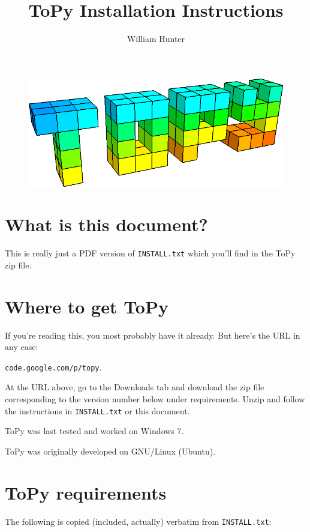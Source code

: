 \documentclass[10pt, a4paper]{article}
\author{William Hunter}
\title{ToPy Installation Instructions}
\begin{document}
\begin{figure}[!ht]
\centering
\includegraphics[scale=0.25]{topy_logo3d.png}
\end{figure}

\tableofcontents

\section{What is this document?}
This is really just a PDF version of \texttt{INSTALL.txt} which you'll find in the ToPy zip file.

\section{Where to get ToPy}
If you're reading this, you most probably have it already. But here's the URL in any case:

\texttt{code.google.com/p/topy}.

At the URL above, go to the \textsf{Downloads} tab and download the zip file corresponding to the version
number below under requirements. Unzip and follow the instructions in \texttt{INSTALL.txt} or this document.

ToPy was last tested and worked on \textsf{Windows 7}.

ToPy was originally developed on \textsf{GNU/Linux}
(Ubuntu).

\clearpage
\section{ToPy requirements}
The following is copied (included, actually) verbatim from \texttt{INSTALL.txt}:



\clearpage
\end{document}
